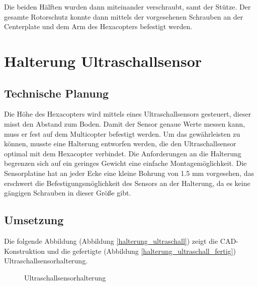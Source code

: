 Die beiden Hälften wurden dann miteinander verschraubt, samt der Stütze.
Der gesamte Rotorschutz konnte dann mittels der vorgesehenen Schrauben an der Centerplate und dem Arm des Hexacopters befestigt werden.

			\newpage

\section{Halterung Ultraschallsensor}

	\subsection{Technische Planung}

	Die Höhe des Hexacopters wird mittels eines Ultraschallsensors gesteuert, dieser misst den Abstand zum Boden.
	Damit der Sensor genaue Werte messen kann, muss er fest auf dem Multicopter befestigt werden.
	Um das gewährleisten zu können, musste eine Halterung entworfen werden, die den Ultraschallsensor optimal mit dem Hexacopter verbindet.
	Die Anforderungen an die Halterung begrenzen sich auf ein geringes Gewicht \bzw eine einfache Montagemöglichkeit.
	Die Sensorplatine hat an jeder Ecke eine kleine Bohrung von 1.5 mm vorgesehen, das erschwert die Befestigungsmöglichkeit des Sensors an der Halterung, da es keine gängigen Schrauben in dieser Größe gibt.

	\subsection{Umsetzung}

	Die folgende Abbildung (Abbildung \ref{halterung_ultraschall}) zeigt die CAD-Konstruktion und die gefertigte (Abbildung \ref{halterung_ultraschall_fertig}) Ultraschallsensorhalterung.

			\begin{figure}[H]
				\begin{centering}
				\par\end{centering}
				\caption{Ultraschallsensorhalterung}
				\label{Halterung_Ultraschallsensor}
			\end{figure}

